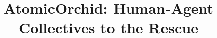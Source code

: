 \documentclass{aamas_demos}
\begin{document}


\title{AtomicOrchid: Human-Agent Collectives to the Rescue\vspace{-3mm}}



%
%
%
%

%

\end{document}
